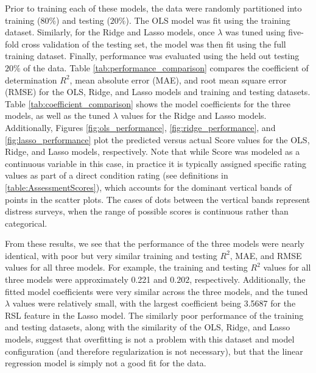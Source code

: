 \documentclass[NewProceedings,letterpaper,NoPageNumbers,NoLineNumbers, DoubleSpace]{ascelike-new}
\begin{document}
Prior to training each of these models, the data were randomly partitioned into training ($80\%$) and testing ($20\%$). The OLS model was fit using the training dataset. Similarly, for the Ridge and Lasso models, once  $\lambda$ was tuned using five-fold cross validation of the testing set, the model was then fit using the full training dataset. Finally, performance was evaluated using the held out testing $20\%$ of the data. Table \ref{tab:performance_comparison} compares the coefficient of determination $R^2$, mean absolute error (MAE), and root mean square error (RMSE) for the OLS, Ridge, and Lasso models and training and testing datasets. Table \ref{tab:coefficient_comparison} shows the model coefficients for the three models, as well as the tuned $\lambda$ values for the Ridge and Lasso models. Additionally, Figures \ref{fig:ols_performance}, \ref{fig:ridge_performance}, and \ref{fig:lasso_performance} plot the predicted versus actual Score values for the OLS, Ridge, and Lasso models, respectively. Note that while Score was modeled as a continuous variable in this case, in practice it is typically assigned specific rating values as part of a direct condition rating (see definitions in \ref{table:AssessmentScores}), which accounts for the dominant vertical bands of points in the scatter plots. The cases of dots between the vertical bands represent distress surveys, when the range of possible scores is continuous rather than categorical.

From these results, we see that the performance of the three models were nearly identical, with poor but very similar training and testing $R^2$, MAE, and RMSE values for all three models. For example, the training and testing $R^2$ values for all three models were approximately 0.221 and $0.202$, respectively. Additionally, the fitted model coefficients were very similar across the three models, and the tuned $\lambda$ values were relatively small, with the largest coefficient being 3.5687 for the RSL feature in the Lasso model. The similarly poor performance of the training and testing datasets, along with the similarity of the OLS, Ridge, and Lasso models, suggest that overfitting is not a problem with this dataset and model configuration (and therefore regularization is not necessary), but that the linear regression model is simply not a good fit for the data.
\end{document}
